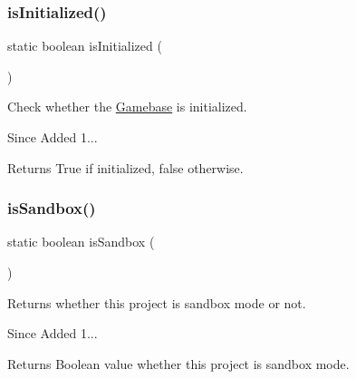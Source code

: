 \subsubsection{\texorpdfstring{is\+Initialized()}{isInitialized()}}
{\footnotesize\ttfamily static boolean is\+Initialized (\begin{DoxyParamCaption}{ }\end{DoxyParamCaption})\hspace{0.3cm}{\ttfamily [static]}}



Check whether the \hyperlink{classcom_1_1toast_1_1android_1_1gamebase_1_1_gamebase}{Gamebase} is initialized. 

\begin{DoxySince}{Since}
Added 1... 
\end{DoxySince}
\begin{DoxyReturn}{Returns}
True if initialized, false otherwise. 
\end{DoxyReturn}
\mbox{\label{classcom_1_1toast_1_1android_1_1gamebase_1_1_gamebase_ab2dc0892a980b519fd76e15bcecb3bb5}} 
\subsubsection{\texorpdfstring{is\+Sandbox()}{isSandbox()}}
{\footnotesize\ttfamily static boolean is\+Sandbox (\begin{DoxyParamCaption}{ }\end{DoxyParamCaption})\hspace{0.3cm}{\ttfamily [static]}}



Returns whether this project is sandbox mode or not. 

\begin{DoxySince}{Since}
Added 1... 
\end{DoxySince}
\begin{DoxyReturn}{Returns}
Boolean value whether this project is sandbox mode. 
\end{DoxyReturn}
\mbox{\label{classcom_1_1toast_1_1android_1_1gamebase_1_1_gamebase_adec8e86d913bbdb88df6244f7aec6f2a}} 
